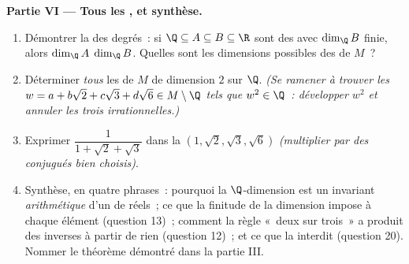 \begin{problem}
\medskip
\noindent\textbf{Partie VI --- Tous les , et synthèse.}
\begin{enumerate}[resume]
  \item Démontrer la  des degrés~: si $\Q \subseteq A
        \subseteq B \subseteq \R$ sont des  avec $\dim_\Q B$
        finie, alors $\dim_\Q A$  $\dim_\Q B$. Quelles sont les
        dimensions possibles des  de $M$~?
  \item Déterminer \emph{tous} les  de $M$ de dimension $2$
        sur $\Q$. \emph{(Se ramener à trouver les $w = a + b\sqrt2
        + c\sqrt3 + d\sqrt6 \in M \setminus \Q$ tels que $w^2 \in
        \Q$~: développer $w^2$ et annuler les trois 
        irrationnelles.)}
  \item Exprimer $\dfrac1{1 + \sqrt2 + \sqrt3}$ dans la  $(1,
        \sqrt2, \sqrt3, \sqrt6)$ \emph{(multiplier par des conjugués
        bien choisis)}.
  \item Synthèse, en quatre phrases~: pourquoi la $\Q$-dimension est
        un invariant \emph{arithmétique} d'un  de réels~; ce
        que la finitude de la dimension impose à chaque élément
        (question 13)~; comment la règle «~deux sur trois~» a produit
        des inverses à partir de rien (question 12)~; et ce que la
         interdit (question 20). Nommer le théorème
        démontré dans la partie III.
\end{enumerate}
\end{problem}
